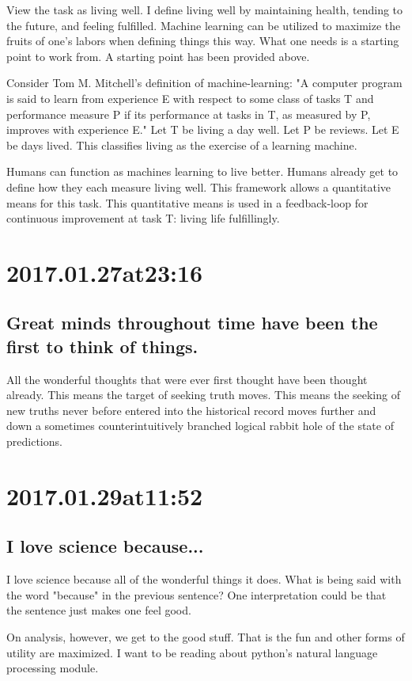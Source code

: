 \begin{enumerate}
\begin{enumerate}
View the task as living well.
I define living well by maintaining health, tending to the future, and feeling fulfilled.
Machine learning can be utilized to maximize the fruits of one's labors when defining things this way.
What one needs is a starting point to work from.
A starting point has been provided above. 

Consider Tom M. Mitchell's definition of machine-learning: "A computer program is said to learn from experience E with respect to some class of tasks T and performance measure P if its performance at tasks in T, as measured by P, improves with experience E."
Let T be living a day well.
Let P be reviews.
Let E be days lived.
This classifies living as the exercise of a learning machine.

Humans can function as machines learning to live better.
Humans already get to define how they each measure living well.
This framework allows a quantitative means for this task.
This quantitative means is used in a feedback-loop for continuous improvement at task T: living life fulfillingly.

\section*{ 2017.01.27at23:16 }
\subsection*{ Great minds throughout time have been the first to think of things. }
All the wonderful thoughts that were ever first thought have been thought already.
This means the target of seeking truth moves.
This means the seeking of new truths never before entered into the historical record moves further and down a sometimes counterintuitively branched logical rabbit hole of the state of predictions.

\section*{ 2017.01.29at11:52 }
\subsection*{ I love science because... }
I love science because all of the wonderful things it does.
What is being said with the word "because" in the previous sentence?
One interpretation could be that the sentence just makes one feel good.

On analysis, however, we get to the good stuff.
That is the fun and other forms of utility are maximized.
I want to be reading about python's natural language processing module.


\end{enumerate}
\end{enumerate}

